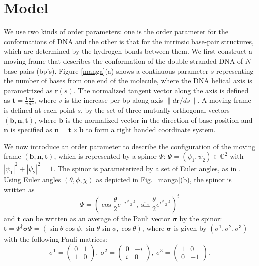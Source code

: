 \documentclass[pre,showpacs,twocolumn,superscriptaddress]{revtex4}
\begin{document}
\section{Model } 
We use two kinds of order parameters: 
one is the order parameter for the conformations of DNA and the other is that for 
the intrinsic base-pair structures, which are determined by the hydrogen bonds between 
them. 
We first construct a moving frame that describes the conformation of the 
double-stranded DNA of $N$ base-pairs (bp's). 
Figure \ref{manga}(a) shows a continuous parameter $s$ representing the number of bases 
from one end of the molecule, where the DNA helical axis is parametrized as ${\bm 
r}(s)$. 
The normalized tangent vector along the axis is defined as 
$ {\bm t } = \frac{1}{v} \frac{d {\bm r}}{ds}$,
where $v$ is the increase per bp along axis $\|d {\bm r}/ds\| $.  
A moving frame is defined at each point $s$, by the set of three mutually orthogonal 
vectors 
$({\bm b}, {\bm n},{\bm t})$,
where ${\bm b}$ is the normalized vector in the direction of base position 
and $\bm n$ is specified as $ {\bm n} = {\bm t}\times {\bm b}$ to form a right handed 
coordinate system.

We now introduce an order parameter to describe the configuration of the moving frame 
$({\bm b}, {\bm n},{\bm t})$, 
which is represented by a spinor $ \Psi $:
$\Psi=(\psi_1,\psi_2)\in \mathbb{C}^2$ 
with $|\psi_1|^2+|\psi_2|^2=1$.
The spinor is parameterized by a set of Euler angles, as in \cite{LL}.
Using Euler angles $ (\theta, \phi, \chi) $ as depicted in Fig.~\ref{manga}(b),
the spinor is written as 
\begin{equation}
\Psi=(
\cos\frac{\theta}{2}e^{-i\frac{\phi+ \chi}{2}},
\sin\frac{\theta}{2}e^{i\frac{\phi- \chi}{2}})^t 
\end{equation}
and 
$ {\bm t} $ can be written as an average of the Pauli
vector $ {\bm \sigma} $ by the spinor: 
$
\bm{t}=
\Psi^{\dagger}\bm{\sigma} \Psi  = 
(\sin \theta \cos \phi ,\sin \theta \sin \phi , \cos \theta )
$,
where ${\bm \sigma}$ is given by  $(\sigma^1,\sigma^2,\sigma^3)$
with the following Pauli matrices:
\begin{equation*}
\sigma^1=
{
\begin{pmatrix}0&1\\1&0\end{pmatrix}
},\ 
\sigma^2=
{
\begin{pmatrix}0&-i\\i&0\end{pmatrix}
},\ 
\sigma^3=
{
\begin{pmatrix}1&0\\0&-1\end{pmatrix}
}
.
\end{equation*}
\end{document}
